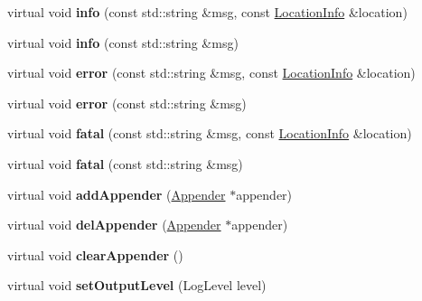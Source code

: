 \begin{DoxyCompactItemize}
virtual void {\bfseries info} (const std\+::string \&msg, const \hyperlink{classDAQ_1_1LocationInfo}{Location\+Info} \&location)
\item 
\mbox{\label{classDAQ_1_1Logger_a0ea91284c5987354cbdbe66be2374e04}} 
virtual void {\bfseries info} (const std\+::string \&msg)
\item 
\mbox{\label{classDAQ_1_1Logger_adc29b0964b915efa49e7be81dfbb0437}} 
virtual void {\bfseries error} (const std\+::string \&msg, const \hyperlink{classDAQ_1_1LocationInfo}{Location\+Info} \&location)
\item 
\mbox{\label{classDAQ_1_1Logger_a85a8849ed41c10729d2954dd9d7d3c8c}} 
virtual void {\bfseries error} (const std\+::string \&msg)
\item 
\mbox{\label{classDAQ_1_1Logger_ae1175764abff8efb6f99dbf4cfa31559}} 
virtual void {\bfseries fatal} (const std\+::string \&msg, const \hyperlink{classDAQ_1_1LocationInfo}{Location\+Info} \&location)
\item 
\mbox{\label{classDAQ_1_1Logger_abe0cf8c30fe53a03df18abb95dff8fe7}} 
virtual void {\bfseries fatal} (const std\+::string \&msg)
\item 
\mbox{\label{classDAQ_1_1Logger_a06b8683744ed4ee729810f61b8b3037e}} 
virtual void {\bfseries add\+Appender} (\hyperlink{classDAQ_1_1Appender}{Appender} $\ast$appender)
\item 
\mbox{\label{classDAQ_1_1Logger_ac26da780c14d6dc360a96d2a296a81d6}} 
virtual void {\bfseries del\+Appender} (\hyperlink{classDAQ_1_1Appender}{Appender} $\ast$appender)
\item 
\mbox{\label{classDAQ_1_1Logger_ad81475bb18db5c28a52c0165e1065e1e}} 
virtual void {\bfseries clear\+Appender} ()
\item 
\mbox{\label{classDAQ_1_1Logger_a954181974a944dbbffe9976ae07f3bd1}} 
virtual void {\bfseries set\+Output\+Level} (Log\+Level level)
\item 
\mbox{\label{classDAQ_1_1Logger_a1729fc3092d097c99d947d05cfb64e1e}} 

\end{DoxyCompactItemize}
